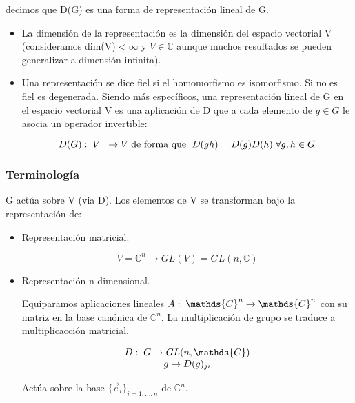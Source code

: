 \documentclass{article}
\begin{document}
decimos que D(G) es una forma de representación lineal de G.

\begin{itemize}
    \item La dimensión de la representación es la dimensión del espacio vectorial V (consideramos dim(V)$<\infty$ y $V\in \mathds{C}$ aunque muchos resultados se pueden generalizar a dimensión infinita).
    \item Una representación se dice fiel si el homomorfismo es isomorfismo. Si no es fiel es degenerada. Siendo más específicos, una representación lineal de G en el espacio vectorial V es una aplicación de D que a cada elemento de $g\in G$ le asocia un operador invertible: 
    
    $$D(G): \hspace{0.1cm} V \hspace{0.2cm} \to V \hspace{0.1cm}\text{de forma que } \hspace{0.1cm} D(gh)=D(g)D(h)\hspace{0.1cm} \forall g,h \in G$$
\end{itemize}

\subsubsection{Terminología}
G actúa sobre V (via D). Los elementos de V se transforman bajo la representación de:

\begin{itemize}
    \item Representación matricial.
    
    $$V=\mathds{C}^n\to GL(V)=GL(n, \mathds{C})$$
     \item Representación n-dimensional. 
     
     Equiparamos aplicaciones lineales $A: \hspace{0.1cm} \mathds{C}^n \to  \mathds{C}^n$ con su matriz en la base canónica de $\mathds{C}^n$. La multiplicación de grupo se traduce a multiplicacción matricial.
     
     $$\begin{array}{cc}
          D: \hspace{0.1cm}G \to GL(n, \mathds{C}) \\
          g\to D(g)_{ji} 
     \end{array}$$
    
    Actúa sobre la base $\lbrace \Vec{e}_i\rbrace_{i=1,...,n}$ de $\mathds{C}^n$.
\end{itemize}
\end{document}

